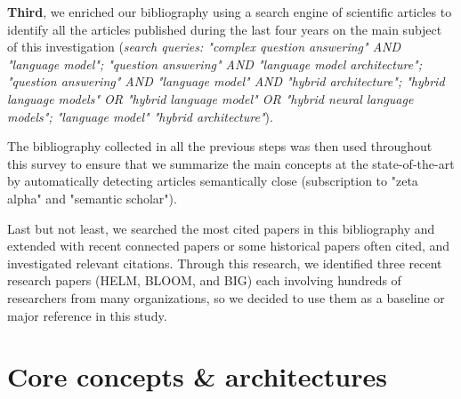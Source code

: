 \documentclass[acmsmall]{acmart}
\begin{document}
\textbf{Third}, we enriched our bibliography using a search engine of scientific articles to identify all the articles published during the last four years on the main subject of this investigation (\small{\textit{search queries: "complex question answering" AND "language model"; "question answering" AND "language model architecture"; "question answering" AND "language model" AND "hybrid architecture"; "hybrid language models" OR "hybrid language model" OR "hybrid neural language models"; "language model" "hybrid architecture"}}).

The bibliography collected in all the previous steps was then used throughout this survey to ensure that we summarize the main concepts at the state-of-the-art by automatically detecting articles semantically close (subscription to "zeta alpha" and "semantic scholar").

Last but not least, we searched the most cited papers in this bibliography and extended with recent connected papers or some historical papers often cited, and investigated relevant citations. Through this research, we identified three recent research papers (HELM, BLOOM, and BIG) each involving hundreds of researchers from many organizations, so we decided to use them as a baseline or major reference in this study.

\section{Core concepts \& architectures}\label{sec_core_concepts}
\end{document}
